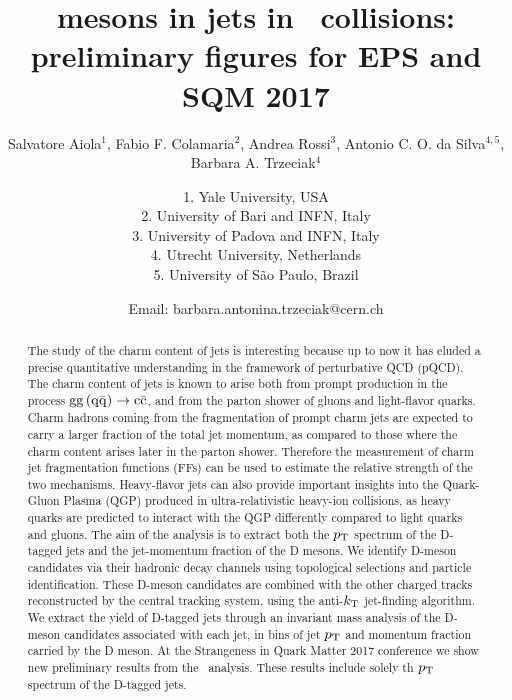 \documentclass[ALICE,manyauthors]{ALICE_analysis_notes}
\begin{document}
%
%
%
\begin{titlepage}
%
\PHdate{\today}
%
\title{\Dstar mesons in jets in \pPb\ collisions: preliminary figures for EPS and SQM 2017}
%
\author{Salvatore Aiola$^{1}$, Fabio F. Colamaria$^{2}$, Andrea Rossi$^{3}$, Antonio C. O. da Silva$^{4,5}$, Barbara A. Trzeciak$^{4}$}
\author{
1. Yale University, USA\\
2. University of Bari and INFN, Italy\\
3. University of Padova and INFN, Italy\\
4. Utrecht University, Netherlands\\
5. University of S\~ao Paulo, Brazil\\
}
\author{Email: barbara.antonina.trzeciak@cern.ch}
%
%
\begin{abstract}
The study of the charm content of jets is interesting because up to now
it has eluded a precise quantitative understanding in the framework of perturbative QCD (pQCD).
The charm content of jets is known to arise both from prompt production in the process ${\rm gg\, (q\bar{q})} \rightarrow {\rm c\bar{c}}$, and
from the parton shower of gluons and light-flavor quarks.
Charm hadrons coming from the fragmentation of prompt charm jets 
are expected to carry a larger fraction of the total jet momentum,
as compared to those where the charm content arises later in the
parton shower. Therefore the measurement of charm jet fragmentation functions (FFs) 
can be used to estimate the relative strength of the two mechanisms.
Heavy-flavor jets can also provide important insights into the Quark-Gluon Plasma (QGP)
produced in ultra-relativistic heavy-ion collisions, as heavy quarks are predicted
to interact with the QGP differently compared to light quarks and gluons. 
The aim of the analysis is to extract both the $p_{\rm T}$ spectrum of the D-tagged jets and the jet-momentum fraction of the D mesons. 
We identify D-meson candidates via their hadronic decay channels using topological selections and particle identification.
These D-meson candidates are combined with the other charged tracks reconstructed by the central tracking system, 
using the anti-$k_{\rm T}$ jet-finding algorithm.
We extract the yield of D-tagged jets through an invariant mass analysis of the D-meson candidates associated with each jet, 
in bins of jet $p_{\rm T}$ and momentum fraction carried by the D meson.
At the Strangeness in Quark Matter 2017 conference we show new preliminary results from the \pPb\ analysis. These results
include solely th $p_{\rm T}$ spectrum of the D-tagged jets.
\end{abstract}
\end{titlepage}
%
\tableofcontents
\newpage
\end{document}
